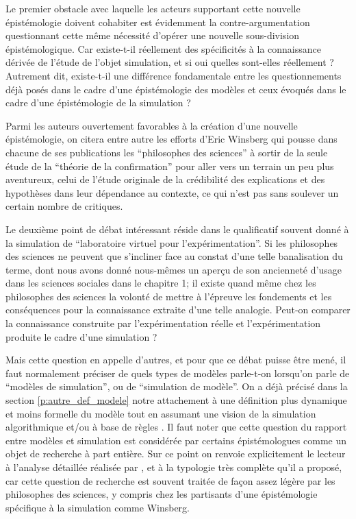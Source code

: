 Le premier obstacle avec laquelle les acteurs supportant cette nouvelle épistémologie doivent cohabiter est évidemment la contre-argumentation questionnant cette même nécessité d'opérer une nouvelle sous-division épistémologique. Car existe-t-il réellement des spécificités à la connaissance dérivée de l'étude de l'objet simulation, et si oui quelles sont-elles réellement ? Autrement dit, existe-t-il une différence fondamentale entre les questionnements déjà posés dans le cadre d'une épistémologie des modèles et ceux évoqués dans le cadre d'une épistémologie de la simulation ?

Parmi les auteurs ouvertement favorables à la création d'une nouvelle épistémologie, on citera entre autre les efforts d'Eric Winsberg \autocites{Winsberg2001, Winsberg2009, Winsberg2013} qui pousse dans chacune de ses publications les \enquote{philosophes des sciences} à sortir de la seule étude de la \enquote{théorie de la confirmation} pour aller vers un terrain un peu plus aventureux, celui de l'étude originale de la crédibilité des explications et des hypothèses dans leur dépendance au contexte, ce qui n'est pas sans soulever un certain nombre de critiques.

Le deuxième point de débat intéressant réside dans le qualificatif souvent donné à la simulation de \enquote{laboratoire virtuel pour l'expérimentation}. Si les philosophes des sciences ne peuvent que s'incliner face au constat d'une telle banalisation du terme, dont nous avons donné nous-mêmes un aperçu de son ancienneté d'usage dans les sciences sociales dans le chapitre 1; il existe quand même chez les philosophes des sciences la volonté de mettre à l'épreuve les fondements et les conséquences pour la connaissance extraite d'une telle analogie. Peut-on comparer la connaissance construite par l'expérimentation réelle et l'expérimentation produite le cadre d'une simulation ?

Mais cette question en appelle d'autres, et pour que ce débat puisse être mené, il faut normalement préciser de quels types de modèles parle-t-on lorsqu'on parle de \enquote{modèles de simulation}, ou de \enquote{simulation de modèle}. On a déjà précisé dans la section \ref{p:autre_def_modele} notre attachement à une définition plus dynamique et moins formelle du modèle \autocites{Haggett1965,Langlois2005} tout en assumant une vision de la simulation algorithmique et/ou à base de règles \autocite{Varenne2013b}. Il faut noter que cette question du rapport entre modèles et simulation est considérée par certains épistémologues comme un objet de recherche à part entière. Sur ce point on renvoie explicitement le lecteur à l'analyse détaillée réalisée par \textcite{Varenne2013b}, et à la typologie très complète qu'il a proposé, car cette question de recherche est souvent traitée de façon assez légère par les philosophes des sciences, y compris chez les partisants d'une épistémologie spécifique à la simulation comme Winsberg.

